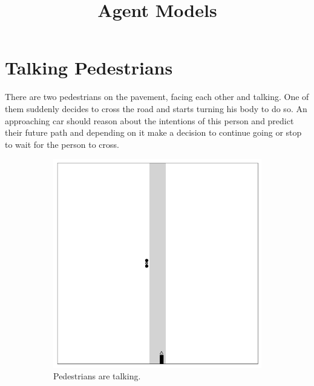 \documentclass[a4paper]{article}
\title{Agent Models}
\begin{document}
\maketitle

\section{Talking Pedestrians}
There are two pedestrians on the pavement, facing each other and talking.
One of them suddenly decides to cross the road and starts turning his body to do so.
An approaching car should reason about the intentions of this person and predict their future path and depending on it make a decision to continue going or stop to wait for the person to cross.
\begin{figure}[htb]
    \centering
    \begin{subfigure}[t]{0.3\textwidth}
        \centering
        \includegraphics[width=\textwidth]{figures/talking_pedestrians_1.png}
        \caption{Pedestrians are talking.}
    \end{subfigure}
    ~ 
    \begin{subfigure}[t]{0.3\textwidth}
        \centering

\end{subfigure}
\end{figure}
\end{document}
